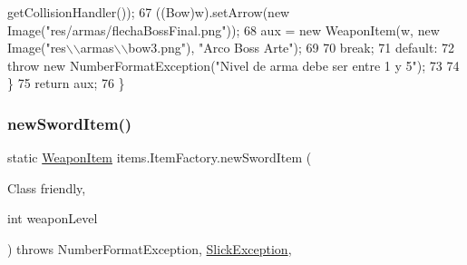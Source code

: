 \begin{DoxyCode}
      getCollisionHandler());
67                 ((Bow)w).setArrow(\textcolor{keyword}{new} Image(\textcolor{stringliteral}{"res/armas/flechaBossFinal.png"}));
68                 aux = \textcolor{keyword}{new} WeaponItem(w, \textcolor{keyword}{new} Image(\textcolor{stringliteral}{"res\(\backslash\)\(\backslash\)armas\(\backslash\)\(\backslash\)bow3.png"}), \textcolor{stringliteral}{"Arco Boss Arte"});
69 
70                 \textcolor{keywordflow}{break};
71             \textcolor{keywordflow}{default}:
72                 \textcolor{keywordflow}{throw} \textcolor{keyword}{new} NumberFormatException(\textcolor{stringliteral}{"Nivel de arma debe ser entre 1 y 5"});
73 
74         \}
75         \textcolor{keywordflow}{return} aux;
76     \}
\end{DoxyCode}
\mbox{\label{classitems_1_1_item_factory_abb755482bc46d97e59fa015d2a87a630}} 
\subsubsection{\texorpdfstring{new\+Sword\+Item()}{newSwordItem()}}
{\footnotesize\ttfamily static \mbox{\hyperlink{classitems_1_1_weapon_item}{Weapon\+Item}} items.\+Item\+Factory.\+new\+Sword\+Item (\begin{DoxyParamCaption}\item[{Class}]{friendly,  }\item[{int}]{weapon\+Level }\end{DoxyParamCaption}) throws Number\+Format\+Exception, \mbox{\hyperlink{classorg_1_1newdawn_1_1slick_1_1_slick_exception}{Slick\+Exception}}\hspace{0.3cm}{\ttfamily [inline]}, {\ttfamily [static]}}


